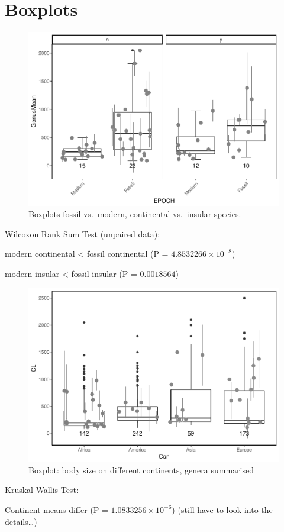 \section{Boxplots}


\begin{figure}[htbp]
	\centering
	\includegraphics{MA_JJ_files/figure-latex/BPFMCI-1.pdf}
	\caption{Boxplots fossil vs.~modern, continental vs.~insular species.}
	\label{BoxFoMCI}
\end{figure}


Wilcoxon Rank Sum Test (unpaired data):

modern continental \textless{} fossil continental (P =
\(4.8532266\times 10^{-8}\))

modern insular \textless{} fossil insular (P = \(0.0018564\))




\begin{figure}[htbp]
	\centering
	\includegraphics{MA_JJ_files/figure-latex/BPCon-1.pdf}
	\caption{Boxplot: body size on different continents, genera summarised}
\end{figure}


Kruskal-Wallis-Test:

Continent means differ (P = \(1.0833256\times 10^{-6}\)) (still have to
look into the details\ldots{})